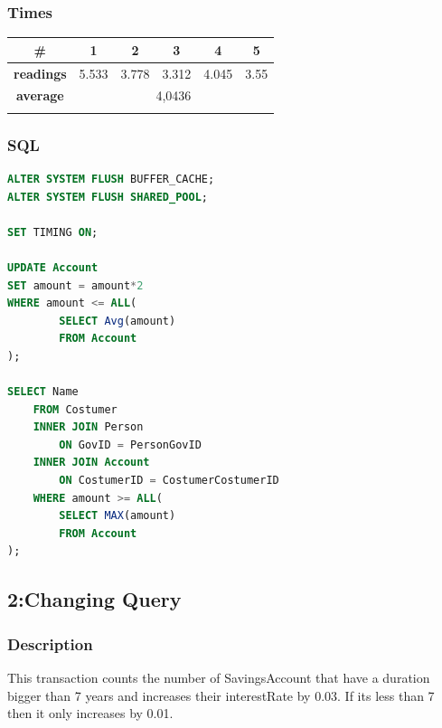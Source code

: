 \documentclass[a4paper, 10pt]{article}
\begin{document}
\subsubsection{Times}
\begin{table}[H]
\centering
\begin{tabular}{cccccc}
\hline
\multicolumn{1}{|c|}{\textbf{\#}}       & \multicolumn{1}{c|}{\textbf{1}} & \multicolumn{1}{c|}{\textbf{2}} & \multicolumn{1}{c|}{\textbf{3}} & \multicolumn{1}{c|}{\textbf{4}} & \multicolumn{1}{c|}{\textbf{5}} \\ \hline
\multicolumn{1}{|c|}{\textbf{readings}} & \multicolumn{1}{c|}{5.533}           & \multicolumn{1}{c|}{3.778}           & \multicolumn{1}{c|}{3.312}           & \multicolumn{1}{c|}{4.045}           & \multicolumn{1}{c|}{3.55}           \\ \hline
\multicolumn{1}{|c|}{\textbf{average}}      & \multicolumn{5}{c|}{4,0436}                                                                                                                                                   \\ \hline
\textbf{}                               & \textbf{}                       & \textbf{}                       & \textbf{}                       & \textbf{}                       & \textbf{}                      
\end{tabular}
\end{table}
\subsubsection{SQL}
\begin{lstlisting}[language=SQL]
ALTER SYSTEM FLUSH BUFFER_CACHE;
ALTER SYSTEM FLUSH SHARED_POOL;

SET TIMING ON;

UPDATE Account 
SET amount = amount*2 
WHERE amount <= ALL(
        SELECT Avg(amount) 
        FROM Account 
);

SELECT Name
    FROM Costumer
    INNER JOIN Person
        ON GovID = PersonGovID 
    INNER JOIN Account 
        ON CostumerID = CostumerCostumerID
    WHERE amount >= ALL(
        SELECT MAX(amount) 
        FROM Account 
);
\end{lstlisting}

\subsection{2:Changing Query}
\subsubsection{Description}
This transaction counts the number of SavingsAccount that have a duration bigger than 7 years and increases their interestRate by 0.03. If its less than 7 then it only increases by 0.01.
\end{document}
